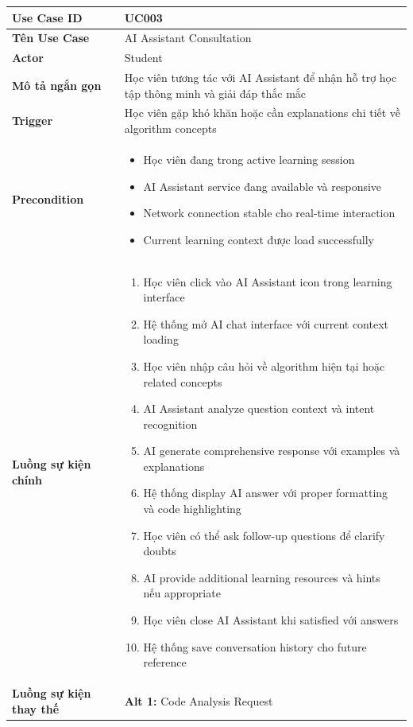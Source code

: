\begin{longtable}{| p{3cm} | p{10cm} |}
\hline
\textbf{Use Case ID} & UC003 \\ \hline
\textbf{Tên Use Case} & AI Assistant Consultation \\ \hline
\textbf{Actor} & Student \\ \hline
\textbf{Mô tả ngắn gọn} & Học viên tương tác với AI Assistant để nhận hỗ trợ học tập thông minh và giải đáp thắc mắc \\ \hline
\textbf{Trigger} & Học viên gặp khó khăn hoặc cần explanations chi tiết về algorithm concepts \\ \hline
\textbf{Precondition} & 
\begin{itemize}
    \item Học viên đang trong active learning session
    \item AI Assistant service đang available và responsive
    \item Network connection stable cho real-time interaction
    \item Current learning context được load successfully
\end{itemize} \\ \hline
\textbf{Luồng sự kiện chính} & 
\begin{enumerate}
    \item Học viên click vào AI Assistant icon trong learning interface
    \item Hệ thống mở AI chat interface với current context loading
    \item Học viên nhập câu hỏi về algorithm hiện tại hoặc related concepts
    \item AI Assistant analyze question context và intent recognition
    \item AI generate comprehensive response với examples và explanations
    \item Hệ thống display AI answer với proper formatting và code highlighting
    \item Học viên có thể ask follow-up questions để clarify doubts
    \item AI provide additional learning resources và hints nếu appropriate
    \item Học viên close AI Assistant khi satisfied với answers
    \item Hệ thống save conversation history cho future reference
\end{enumerate} \\ \hline
\textbf{Luồng sự kiện thay thế} & 
\textbf{Alt 1:} Code Analysis Request

\end{longtable}
